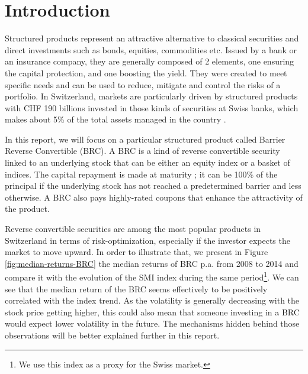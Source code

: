 \documentclass[a4paper,11pt,english]{book}
\begin{document}
\pagestyle{empty}
\tableofcontents
\listoffigures
\listoftables

\mainmatter
\chapter*{Introduction}
\vspace*{-2cm}

Structured products represent an attractive alternative to classical securities and direct investments such as bonds, equities, commodities etc. Issued by a bank or an insurance company, they are generally composed of 2 elements, one ensuring the capital protection, and one boosting the yield. They were created to meet specific needs and can be used to reduce, mitigate and control the risks of a portfolio. In Switzerland, markets are particularly driven by structured products with CHF 190 billions invested in those kinds of securities at Swiss banks, which makes about 5\% of the total assets managed in the country \cite{SSPA}.

In this report, we will focus on a particular structured product called Barrier Reverse Convertible (BRC). A BRC is a kind of reverse convertible security linked to an underlying stock that can be either an equity index or a basket of indices. The capital repayment is made at maturity ; it can be 100\% of the principal if the underlying stock has not reached a predetermined barrier and less otherwise. A BRC also pays highly-rated coupons that enhance the attractivity of the product.

Reverse convertible securities are among the most popular products in Switzerland in terms of risk-optimization, especially if the investor expects the market to move upward. In order to illustrate that, we present in Figure \ref{fig:median-returns-BRC} the median returns of BRC p.a. from 2008 to 2014 \cite{SSPA-study} and compare it with the evolution of the SMI index during the same period\footnote{We use this index as a proxy for the Swiss market.}. We can see that the median return of the BRC seems effectively to be positively correlated with the index trend. As the volatility is generally decreasing with the stock price getting higher, this could also mean that someone investing in a BRC would expect lower volatility in the future. The mechanisms hidden behind those observations will be better explained further in this report.
\end{document}
